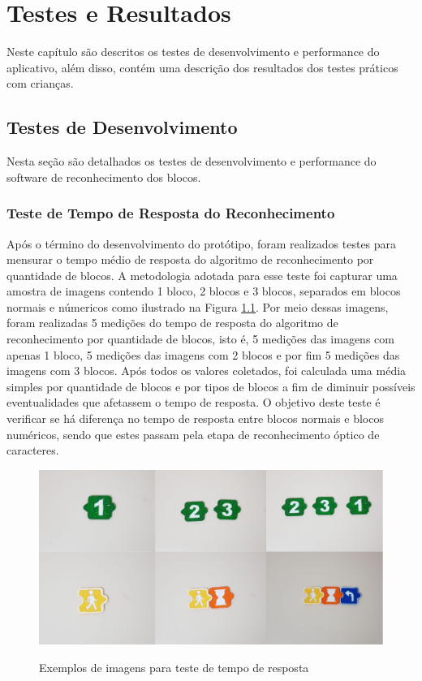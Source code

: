 \chapter{Testes e Resultados}\label{cap:testes_e_resultados}
Neste capítulo são descritos os testes de desenvolvimento e performance do aplicativo, além disso, contém uma descrição dos resultados dos testes práticos com crianças.

\section{Testes de Desenvolvimento}

Nesta seção são detalhados os testes de desenvolvimento e performance do software de reconhecimento dos blocos.


\subsection{\textbf{Teste de Tempo de Resposta do Reconhecimento}}

Após o término do desenvolvimento do protótipo, foram realizados testes para mensurar o tempo médio de resposta do algoritmo de reconhecimento por quantidade de blocos. A metodologia adotada para esse teste foi capturar uma amostra de imagens contendo 1 bloco, 2 blocos e 3 blocos, separados em blocos normais e númericos como ilustrado na Figura \ref{figura:ttr}. Por meio dessas imagens, foram realizadas 5 medições do tempo de resposta do algoritmo de reconhecimento por quantidade de blocos, isto é, 5 medições das imagens com apenas 1 bloco, 5 medições das imagens com 2 blocos e por fim 5 medições das imagens com 3 blocos. Após todos os valores coletados, foi calculada uma média simples por quantidade de blocos e por tipos de blocos a fim de diminuir possíveis eventualidades que afetassem o tempo de resposta. O objetivo deste teste é verificar se há diferença no tempo de resposta entre blocos normais e blocos numéricos, sendo que estes passam pela etapa de reconhecimento óptico de caracteres.

\begin{figure}[H]
    \caption{Exemplos de imagens para teste de tempo de resposta}
    \centering
    \includegraphics[width=15cm]{Imagens/Cap5/ttr.png}
    \label{figura:ttr}
\end{figure}

